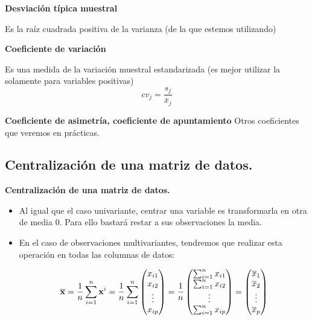 \begin{frame}



\textbf{Desviación típica muestral}

Es la raíz cuadrada positiva de la varianza (de la que estemos utilizando)

\textbf{Coeficiente de variación }

Es  una medida de la variación muestral estandarizada (es mejor utilizar la solamente para variables positivas)
$$cv_j=\frac{s_j}{\overline{x}_j}$$

\textbf{Coeficiente de asimetría, coeficiente de apuntamiento}
Otros coeficientes que veremos en prácticas.





\end{frame}
\subsection{Centralización de una matriz de datos.}
\begin{frame}
\textbf{Centralización de una matriz de datos.}
\begin{itemize}
\item Al igual que el caso univariante, centrar una variable es transformarla en otra de media $0$. Para ello bastará restar a sus observaciones la media.

\item En el caso de observaciones multivariantes, tendremos que realizar esta operación en todas las columnas de datos:

$$\overline{\mathbf{x}}=
\frac{1}{n} \sum_{i=1}^n \mathbf{x}^i =\frac{1}{n} \sum_{i=1}^n \begin{pmatrix}x_{i 1}\\ x_{i 2}\\\vdots\\ x_{i p}    \end{pmatrix}= \frac{1}{n}  \begin{pmatrix} \sum_{i=1}^n x_{i 1}\\ \sum_{i=1}^n x_{i 2}\\\vdots\\ 
\sum_{i=1}^n x_{i p}\end{pmatrix}= \begin{pmatrix} \overline{x}_{1}\\ \overline{x}_{2}\\\vdots\\ \overline{x}_{p}    \end{pmatrix}$$
\end{itemize}
\end{frame}

